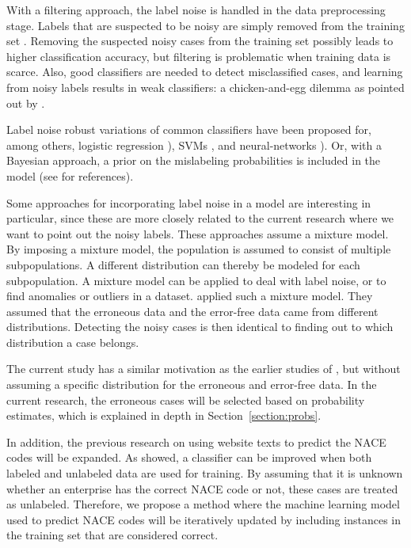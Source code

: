 \documentclass[12pt, a4paper, titlepage]{article}
\begin{document}
With a filtering approach, the label noise is handled in the data preprocessing stage. Labels that are suspected to be noisy are simply removed from the training set \citep{Brodley}. Removing the suspected noisy cases from the training set possibly leads to higher classification accuracy, but filtering is problematic when training data is scarce. Also, good classifiers are needed to detect misclassified cases, and learning from noisy labels results in weak classifiers: a chicken-and-egg dilemma as pointed out by \citet{Angelova}.

Label noise robust variations of common classifiers have been proposed for, among others, logistic regression \citep{Bootkrajang, Rantalainen}), SVMs \citep{Stempfel, Biggio}, and neural-networks \citep{Sigurdsson, Sukhbaatar}). Or, with a Bayesian approach, a prior on the mislabeling probabilities is included in the model (see \citet{Frenay} for references).

Some approaches for incorporating label noise in a model are interesting in particular, since these are more closely related to the current research where we want to point out the noisy labels. These approaches assume a mixture model. By imposing a mixture model, the population is assumed to consist of multiple subpopulations. A different distribution can thereby be modeled for each subpopulation. A mixture model can be applied to deal with label noise, or to find anomalies or outliers in a dataset. \citet{DiZio, Eskin} applied such a mixture model. They assumed that the erroneous data and the error-free data came from different distributions. Detecting the noisy cases is then identical to finding out to which distribution a case belongs.

The current study has a similar motivation as the earlier studies of \citet{DiZio, Eskin}, but without assuming a specific distribution for the erroneous and error-free data. In the current research, the erroneous cases will be selected based on probability estimates, which is explained in depth in Section~\ref{section:probs}. 

In addition, the previous research on using website texts to predict the NACE codes will be expanded. As \citet{Nigam} showed, a classifier can be improved when both labeled and unlabeled data are used for training. By assuming that it is unknown whether an enterprise has the correct NACE code or not, these cases are treated as unlabeled. Therefore, we propose a method where the machine learning model used to predict NACE codes will be iteratively updated by including instances in the training set that are considered correct. 
\end{document}
